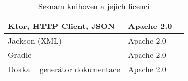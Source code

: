 \begin{table}[hbt!]
\begin{tabular}{|l|l|l|}
        Ktor, HTTP Client, JSON                           & Apache 2.0\tablefootnote{\url{https://github.com/ktorio/ktor/blob/main/LICENSE}}                                          \\ \hline
        Jackson (XML)                                     & Apache 2.0\tablefootnote{\url{https://github.com/FasterXML/jackson-dataformat-xml/blob/master/LICENSE}}                   \\ \hline
        Gradle                                            & Apache 2.0\tablefootnote{\url{https://github.com/gradle/gradle/blob/master/LICENSE}}                                      \\ \hline
        Dokka -- generátor dokumentace                    & Apache 2.0\tablefootnote{\url{https://github.com/Kotlin/dokka/blob/master/LICENSE}}                                       \\ \hline
    \end{tabular}
    \caption{Seznam knihoven a jejich licencí}
    \label{tab:libraries-licenses}
\end{table}
